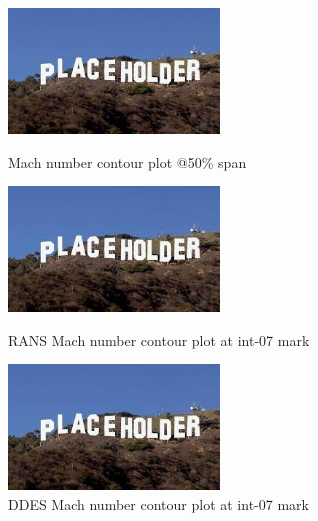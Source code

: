 \begin{figure}[ht]
  \centering
  \includegraphics[width=0.5\textwidth]{Pictures/placeholder.jpg}
  \caption{Mach number contour plot @50\% span \citep{r67laser}} \label{50-mach-exp}
  
  \vspace*{\floatsep}%

  \includegraphics[width=0.5\textwidth]{Pictures/placeholder.jpg}
  \caption{RANS Mach number contour plot at int-07 mark} \label{int-07-rans-mach}
  
   \vspace*{\floatsep}%
   
  \includegraphics[width=0.5\textwidth]{Pictures/placeholder.jpg}
  \caption{DDES Mach number contour plot at int-07 mark} \label{int-07-ddes-mach}
\end{figure}


